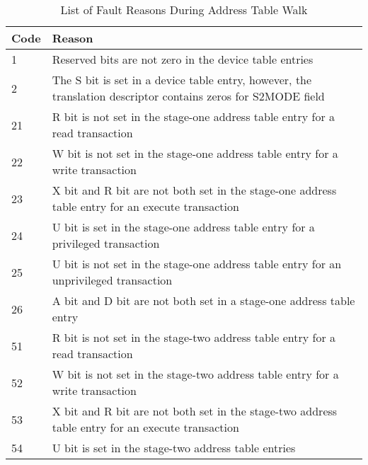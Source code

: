 \begin{table}
    \centering
    \begin{tabular}{| p{0.05\linewidth} | p{0.95\linewidth} |}
        \hline
         Code  & Reason \\
        \hline
         1      & Reserved bits are not zero in the device table entries \\
        \hline
         2      & The S bit is set in a device table entry, however, the translation descriptor contains zeros for S2MODE field \\
        \hline
         21     & R bit is not set in the stage-one address table entry for a read transaction \\
        \hline
         22     & W bit is not set in the stage-one address table entry for a write transaction  \\
        \hline
         23     & X bit and R bit are not both set in the stage-one address table entry for an execute transaction \\
        \hline
         24     & U bit is set in the stage-one address table entry for a privileged transaction \\
        \hline
         25     & U bit is not set in the stage-one address table entry for an unprivileged transaction \\
        \hline
         26     & A bit and D bit are not both set in a stage-one address table entry \\
        \hline
         51    & R bit is not set in the stage-two address table entry for a read transaction \\
        \hline
         52    & W bit is not set in the stage-two address table entry for a write transaction \\
        \hline
         53    & X bit and R bit are not both set in the stage-two address table entry for an execute transaction \\
        \hline
         54    & U bit is set in the stage-two address table entries \\
        \hline
    \end{tabular}
    \caption{List of Fault Reasons During Address Table Walk}
    \label{tbl:fault_reasons}
\end{table}

